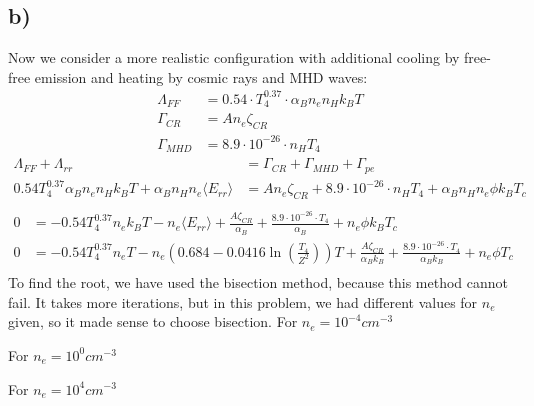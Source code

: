 \subsection*{b)}
Now we consider a more realistic configuration with additional cooling by free-free emission and heating by cosmic rays and MHD waves: 
\begin{align}
    \Lambda_{FF} &= 0.54 \cdot  T^{0.37}_4 \cdot  \alpha_B n_e n_H k_B T\\
    \Gamma_{CR} &= A n_e \zeta_{CR} \\
    \Gamma_{MHD} &= 8.9\cdot 10^{-26} \cdot n_H T_4
\end{align}
\begin{align}
    \Lambda_{FF}+ \Lambda_{rr} &= \Gamma_{CR} + \Gamma_{MHD} + \Gamma_{pe} \\
    0.54 T^{0.37}_4 \alpha_B n_e n_H k_B T +\alpha_B n_H n_e \langle E_{rr} \rangle &= A n_e \zeta_{CR} +  8.9\cdot 10^{-26} \cdot n_H T_4 + \alpha_B n_H n_e \phi k_B T_c \\
\end{align}
\begin{align}
    0 &= - 0.54 T^{0.37}_4 n_e k_B T - n_e  \langle E_{rr} \rangle + \frac{ A \zeta_{CR}}{\alpha_B} +  \frac{8.9\cdot 10^{-26} \cdot T_4}{\alpha_B} + n_e \phi k_B T_c \\  
    0 &= - 0.54 T^{0.37}_4 n_e  T - n_e  \left(0.684-0.0416 \ln \left(\frac{T_4}{Z^2}\right)\right) T + \frac{ A \zeta_{CR}}{\alpha_B k_B} +  \frac{8.9\cdot 10^{-26} \cdot T_4}{\alpha_B k_B} + n_e \phi T_c \\
\end{align}
To find the root, we have used the bisection method, because this method cannot fail. It takes more iterations, but in this problem, we had different values for \( n_e \) given, so it made sense to choose bisection. 
For $n_e= 10^{-4} cm^{-3}$

For $n_e= 10^{0} cm^{-3}$

For $n_e= 10^{4} cm^{-3}$


